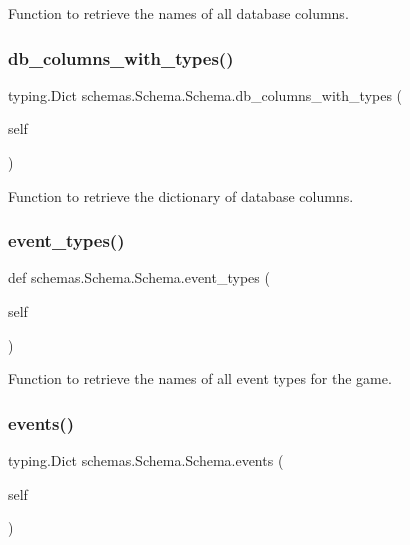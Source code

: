 Function to retrieve the names of all database columns. 

\mbox{\label{classschemas_1_1_schema_1_1_schema_a8195db97a01c5a742d0a2734605acf82}} 
\subsubsection{\texorpdfstring{db\_columns\_with\_types()}{db\_columns\_with\_types()}}
{\footnotesize\ttfamily  typing.\+Dict schemas.\+Schema.\+Schema.\+db\+\_\+columns\+\_\+with\+\_\+types (\begin{DoxyParamCaption}\item[{}]{self }\end{DoxyParamCaption})}



Function to retrieve the dictionary of database columns. 

\mbox{\label{classschemas_1_1_schema_1_1_schema_a701be4bd6663c1e874002a3006a7a7f4}} 
\subsubsection{\texorpdfstring{event\_types()}{event\_types()}}
{\footnotesize\ttfamily def schemas.\+Schema.\+Schema.\+event\+\_\+types (\begin{DoxyParamCaption}\item[{}]{self }\end{DoxyParamCaption})}



Function to retrieve the names of all event types for the game. 

\mbox{\label{classschemas_1_1_schema_1_1_schema_abe06b60ef3219404bdae121d8384d580}} 
\subsubsection{\texorpdfstring{events()}{events()}}
{\footnotesize\ttfamily  typing.\+Dict schemas.\+Schema.\+Schema.\+events (\begin{DoxyParamCaption}\item[{}]{self }\end{DoxyParamCaption})}



